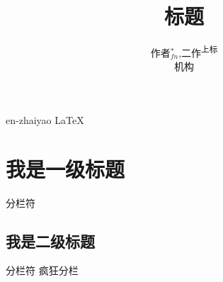 \documentclass[11pt,a4paper,oneside,UTF8,fontset=none]{ctexart}
\title{\Large\timu 标题}  %
\author{\large\zz 作者$^*_{fn}$,二作\textsuperscript{上标} \\\dw\footnotesize 机构}  %
\date{}  %
\newcommand{\zygjzt}[1]{\zygjztcn \zygjzten #1}  %
\newcommand{\zw}[1]{\zwcn \zwen #1}  %
\begin{document}
		\maketitle  %
		\thispagestyle{fancy}  %
		\zygjzt\footnotesize  %
		{en-zhaiyao}\vspace{8em}
		\newline
		\zygjzt\footnotesize
		{LaTeX}\vspace{1em}
		\newline
		
		
		\section{我是一级标题}
		\zw\small
		分\hfill 栏\hfill 符
		
		\subsection{我是二级标题}
		分\hfill 栏\hfill 符
		\newline
		疯\hfill 狂\hfill 分\hfill 栏
		
\end{document}
